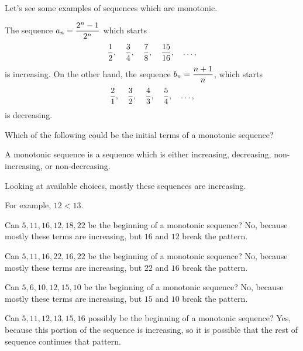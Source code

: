 \documentclass{ximera}
\newcommand{\ds}{\displaystyle}
\begin{document}
Let's see some examples of sequences which are monotonic.
\begin{example}
The sequence $\ds a_n = {2^n-1\over2^n}$ which starts
$$
  {1\over2},\quad {3\over4},\quad {7\over8},\quad {15\over16},\quad \ldots,
$$
is increasing.  On the other hand, the sequence $\ds b_n = {n+1\over n}$, which starts
$$ 
  {2\over1},\quad{3\over2},\quad{4\over3},\quad{5\over4},\quad\ldots,
$$
is decreasing.
\end{example}

\begin{question}
  Which of the following could be the initial terms of a monotonic sequence?

  \begin{solution}
    \begin{hint}
      A monotonic sequence is a sequence which is either increasing, decreasing, non-increasing, or non-decreasing.
    \end{hint}
    \begin{hint}
      Looking at available choices, mostly these sequences are increasing.
    \end{hint}
    \begin{hint}
      For example, \(12 < 13\).
    \end{hint}
    \begin{hint}
      Can \(5,  11,  16,  12,  18,  22 \) be the beginning of a monotonic sequence?  No, because mostly these terms are increasing, but \(16\) and \(12\) break the pattern.
    \end{hint}
    \begin{hint}
      Can \(5,  11,  16,  22,  16,  22 \) be the beginning of a monotonic sequence?  No, because mostly these terms are increasing, but \(22\) and \(16\) break the pattern.
    \end{hint}
    \begin{hint}
      Can \(5,  6,  10,  12,  15,  10 \) be the beginning of a monotonic sequence?  No, because mostly these terms are increasing, but \(15\) and \(10\) break the pattern.
    \end{hint}
    \begin{hint}
      Can \(5,  11,  12,  13,  15,  16 \) possibly be the beginning of a monotonic sequence?  Yes, because this portion of the sequence is increasing, so it is possible that the rest of sequence continues that pattern.
    \end{hint}


    \begin{multiple-choice}
      
    \end{multiple-choice}
    
  \end{solution}
\end{question}
            
\end{document}

